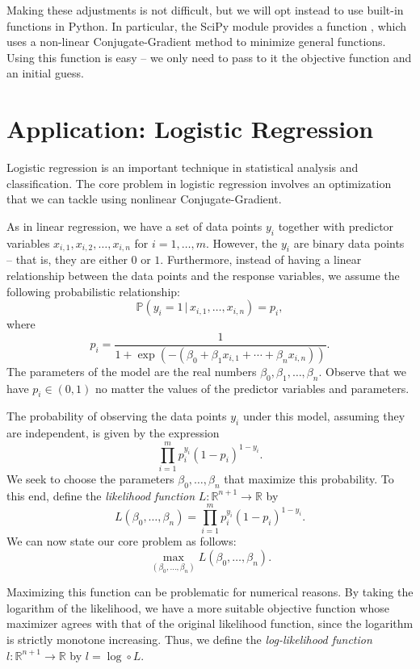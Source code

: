 Making these adjustments is not difficult, but we will opt instead to use built-in functions in Python. In particular,
the SciPy module  provides a function , which uses a non-linear Conjugate-Gradient method
to minimize general functions. Using this function is easy -- we only need to pass to it the objective function and an
initial guess.

\section*{Application: Logistic Regression}
Logistic regression is an important technique in statistical analysis and classification. The core problem in
logistic regression involves an optimization that we can tackle using nonlinear Conjugate-Gradient.

As in linear regression, we have a set of data points $y_i$ together with predictor variables
$x_{i,1}, x_{i,2}, \ldots, x_{i,n}$ for $i = 1, \ldots, m$. However, the $y_i$ are binary data points --
that is, they are either $0$ or $1$. Furthermore, instead of having a linear relationship between the
data points and the response variables, we assume the following probabilistic relationship:
$$
\mathbb{P}(y_i = 1 \, | \, x_{i,1}, \ldots, x_{i,n}) = p_i,
$$
where
$$
p_i = \frac{1}{1+\exp(-(\beta_0 + \beta_1x_{i,1} + \cdots + \beta_nx_{i,n}))}.
$$
The parameters of the model are the real numbers $\beta_0, \beta_1,\ldots, \beta_n$.
Observe that we have $p_i \in (0, 1)$ no matter the values of the predictor variables and parameters.

The probability of observing the data points $y_i$ under this model, assuming they are independent, is given by
the expression
$$
\prod_{i=1}^m p_i^{y_i}(1-p_i)^{1-y_i}.
$$
We seek to choose the parameters $\beta_0, \ldots, \beta_n$ that maximize this probability.
To this end, define the \emph{likelihood function} $L:\mathbb{R}^{n+1} \rightarrow \mathbb{R}$ by
$$
L(\beta_0, \ldots, \beta_n) = \prod_{i=1}^m p_i^{y_i}(1-p_i)^{1-y_i}.
$$
We can now state our core problem as follows:
$$
\max_{(\beta_0,\ldots,\beta_n)}L(\beta_0, \ldots, \beta_n).
$$

Maximizing this function can be problematic for numerical reasons. By taking the logarithm of the likelihood,
we have a more suitable objective function whose maximizer agrees with that of the original likelihood function,
since the logarithm is strictly monotone increasing. Thus, we define the \emph{log-likelihood function}
$l : \mathbb{R}^{n+1} \rightarrow \mathbb{R}$ by $l = \log \circ L$.

